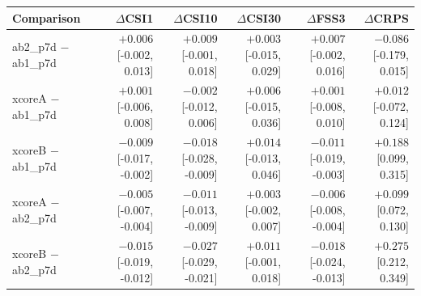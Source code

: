 \begin{tabular}{lrrrrr}
\toprule
Comparison & $\Delta$CSI1 & $\Delta$CSI10 & $\Delta$CSI30 & $\Delta$FSS3 & $\Delta$CRPS \\
\midrule
ab2\_p7d $-$ ab1\_p7d & $+0.006$ [-0.002, 0.013] & $+0.009$ [-0.001, 0.018] & $+0.003$ [-0.015, 0.029] & $+0.007$ [-0.002, 0.016] & $-0.086$ [-0.179, 0.015] \\
xcoreA $-$ ab1\_p7d & $+0.001$ [-0.006, 0.008] & $-0.002$ [-0.012, 0.006] & $+0.006$ [-0.015, 0.036] & $+0.001$ [-0.008, 0.010] & $+0.012$ [-0.072, 0.124] \\
xcoreB $-$ ab1\_p7d & $-0.009$ [-0.017, -0.002] & $-0.018$ [-0.028, -0.009] & $+0.014$ [-0.013, 0.046] & $-0.011$ [-0.019, -0.003] & $+0.188$ [0.099, 0.315] \\
xcoreA $-$ ab2\_p7d & $-0.005$ [-0.007, -0.004] & $-0.011$ [-0.013, -0.009] & $+0.003$ [-0.002, 0.007] & $-0.006$ [-0.008, -0.004] & $+0.099$ [0.072, 0.130] \\
xcoreB $-$ ab2\_p7d & $-0.015$ [-0.019, -0.012] & $-0.027$ [-0.029, -0.021] & $+0.011$ [-0.001, 0.018] & $-0.018$ [-0.024, -0.013] & $+0.275$ [0.212, 0.349] \\
\bottomrule
\end{tabular}
